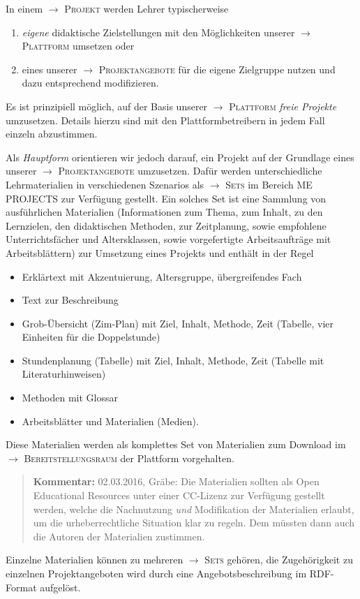 \documentclass[a4paper,11pt]{article}
\newcommand{\Kommentar}[1]{
  \begin{quote}\textbf{Kommentar:} #1 \end{quote}
}
\newcommand{\glossar}[1]{{$\to$ \textsc{#1}}}
\begin{document}
In einem \glossar{Projekt} werden Lehrer typischerweise 
\begin{enumerate}
\item \emph{eigene} didaktische Zielstellungen mit den Möglichkeiten unserer
  \glossar{Plattform} umsetzen oder
\item eines unserer \glossar{Projektangebote} für die eigene Zielgruppe nutzen
  und dazu entsprechend modifizieren.
\end{enumerate}
Es ist prinzipiell möglich, auf der Basis unserer \glossar{Plattform}
\emph{freie Projekte} umzusetzen.  Details hierzu sind mit den
Plattformbetreibern in jedem Fall einzeln abzustimmen. 

Als \emph{Hauptform} orientieren wir jedoch darauf, ein Projekt auf der
Grundlage eines unserer \glossar{Projektangebote} umzusetzen. Dafür werden
unterschiedliche Lehrmaterialien in verschiedenen Szenarios als \glossar{Sets}
im Bereich ME PROJECTS zur Verfügung gestellt. Ein solches Set ist eine
Sammlung von ausführlichen Materialien (Informationen zum Thema, zum Inhalt, zu
den Lernzielen, den didaktischen Methoden, zur Zeitplanung, sowie empfohlene
Unterrichtsfächer und Altersklassen, sowie vorgefertigte Arbeitsaufträge mit
Arbeitsblättern) zur Umsetzung eines Projekts und enthält in der Regel
\begin{itemize}
\item Erklärtext mit Akzentuierung, Altersgruppe, übergreifendes Fach
\item Text zur Beschreibung
\item Grob-Übersicht (Zim-Plan) mit Ziel, Inhalt, Methode, Zeit (Tabelle, vier
  Einheiten für die Doppelstunde)
\item Stundenplanung (Tabelle) mit Ziel, Inhalt, Methode, Zeit (Tabelle mit
  Literaturhinweisen)
\item Methoden mit Glossar
\item Arbeitsblätter und Materialien (Medien).
\end{itemize}
Diese Materialien werden als komplettes Set von Materialien zum Download im
\glossar{Bereitstellungsraum} der Plattform vorgehalten.

\Kommentar{02.03.2016, Gräbe: Die Materialien sollten als Open Educational
  Resources unter einer CC-Lizenz zur Verfügung gestellt werden, welche die
  Nachnutzung \emph{und} Modifikation der Materialien erlaubt, um die
  urheberrechtliche Situation klar zu regeln.  Dem müssten dann auch die
  Autoren der Materialien zustimmen. }

Einzelne Materialien können zu mehreren \glossar{Sets} gehören, die
Zugehörigkeit zu einzelnen Projektangeboten wird durch eine
Angebotsbeschreibung im RDF-Format aufgelöst.
\end{document}
